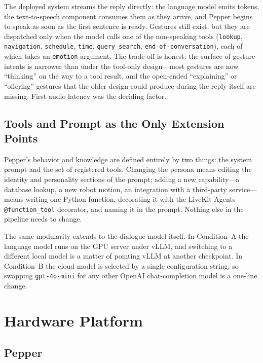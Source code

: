 The deployed system streams the reply directly: the language model emits tokens, the text-to-speech component consumes them as they arrive, and Pepper begins to speak as soon as the first sentence is ready.
Gestures still exist, but they are dispatched only when the model calls one of the non-speaking tools (\texttt{lookup}, \texttt{navigation}, \texttt{schedule}, \texttt{time}, \texttt{query\_search}, \texttt{end-of-conversation}), each of which takes an \texttt{emotion} argument.
The trade-off is honest: the surface of gesture intents is narrower than under the tool-only design---most gestures are now ``thinking'' on the way to a tool result, and the open-ended ``explaining'' or ``offering'' gestures that the older design could produce during the reply itself are missing.
First-audio latency was the deciding factor.

\subsection{Tools and Prompt as the Only Extension Points}
\label{sec:dec_extensibility}

Pepper's behavior and knowledge are defined entirely by two things: the system prompt and the set of registered tools.
Changing the persona means editing the identity and personality sections of the prompt; adding a new capability---a database lookup, a new robot motion, an integration with a third-party service---means writing one Python function, decorating it with the LiveKit Agents \texttt{@function\_tool} decorator, and naming it in the prompt.
Nothing else in the pipeline needs to change.

The same modularity extends to the dialogue model itself.
In Condition~A the language model runs on the GPU server under vLLM, and switching to a different local model is a matter of pointing vLLM at another checkpoint.
In Condition~B the cloud model is selected by a single configuration string, so swapping \texttt{gpt-4o-mini} for any other OpenAI chat-completion model is a one-line change.
\section{Hardware Platform}
\label{sec:hardware}

\subsection{Pepper}
\label{sec:pepper_robot}

